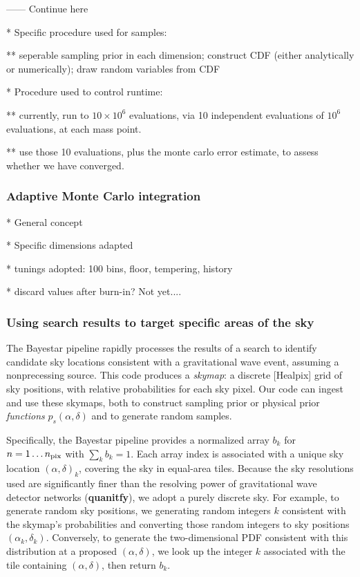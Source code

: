 \documentclass[twocolumn,prd,nofootinbib]{revtex4}
\newcommand\editremark[1]{{\color{red} #1}}
\newcommand\BS{{\sc Bayestar}}
\begin{document}
------ \editremark{Continue here}

* Specific procedure used for samples:

** seperable sampling prior in each dimension; construct CDF (either analytically or
numerically); draw random variables from CDF


* Procedure used to control runtime:

** currently, run to $10\times10^6$ evaluations, via 10 independent evaluations of $10^6$ evaluations, at each mass
point.

** use those 10 evaluations, plus the monte carlo error estimate, to assess whether we have converged.


\subsubsection{Adaptive Monte Carlo integration}

* General concept

* Specific dimensions adapted

* tunings adopted: 100 bins, floor, tempering, history

* discard values after burn-in? Not yet....

\subsubsection{Using search results to target specific areas of the sky}

The \BS{} pipeline \cite{gw-astro-Bayestar} rapidly processes the results of a search to identify candidate sky
locations consistent with a gravitational wave event, assuming a nonprecessing source.   
%
This code produces a \emph{skymap}: a discrete [Healpix] grid of sky positions, with relative probabilities for each sky
pixel.  
%
Our code can ingest and use these skymaps,  both to construct sampling prior or physical prior \emph{functions}
$p_s(\alpha,\delta)$ and to generate random samples. 

Specifically, the \BS{} pipeline provides a normalized array  $b_k$  for $n=1\ldots n_{\rm pix}$ with $\sum_k b_k=1$.    
Each array index is associated with a unique sky location $(\alpha,\delta)_k $, covering the sky in equal-area tiles.  
%
Because the sky resolutions used are  significantly finer than the resolving power of gravitational wave detector networks
(\textbf{quanitfy}), we adopt a purely discrete sky.  For example, to generate  random sky positions, we generating random integers $k$ consistent with
the skymap's probabilities and converting those random integers to sky positions $(\alpha_k,\delta_k)$.  Conversely, to
generate the two-dimensional PDF consistent with this distribution at a proposed $(\alpha,\delta)$, we look up the
integer $k$ associated with the tile containing $(\alpha,\delta)$, then return $b_k$.  
\end{document}

